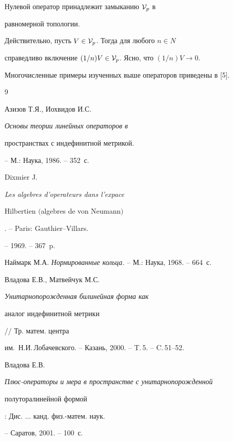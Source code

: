 \begin{note}


Нулевой оператор принадлежит замыканию ${\cal V}_{p}$ в


равномерной топологии.


\end{note}





Действительно, пусть $V\in {\cal V}_{p}$. Тогда для любого $n\in N$


справедливо включение $(1/n)V\in {\cal V}_{p}$. Ясно, что $(1/n)V\to 0$.





Многочисленные примеры изученных выше операторов приведены в [5].








\begin{thebibliography}{9}







Азизов Т.Я., Иохвидов И.С. {\it Основы теории линейных операторов в


пространствах с индефинитной метрикой.} -- М.: Наука, 1986. -- 352~с.




Dixmier J. {\it Les algebres d'operateurs dans l'expace


Hilbertien $($algebres de von Neumann$)$}. -- Paris: Gauthier--Villars.


-- 1969. -- 367~p.




Наймарк М.А. {\it Нормированные кольца.} -- М.: Наука, 1968. -- 664~с.




Владова Е.В., Матвейчук М.С. {\it Унитарнопорожденная билинейная форма как


аналог индефинитной метрики} // Тр. матем. центра


им.~Н.И.\,Лобачевского. -- Казань, 2000. -- T.\,5. -- C.\,51--52.




Владова Е.В. {\it Плюс-операторы и мера в пространстве с унитарнопорожденной 


полуторалинейной формой}: Дис. $\dotsc$ канд. физ.-матем. наук.


-- Саратов, 2001. -- 100~с.





\end{thebibliography}





